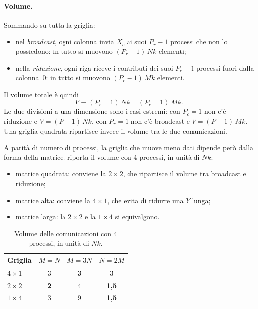 \documentclass[11pt,a4paper]{article}
\begin{document}
\paragraph{Volume.} Sommando su tutta la griglia:
\begin{itemize}
  \item nel \emph{broadcast}, ogni colonna invia $X_c$ ai suoi $P_r - 1$
        processi che non lo possiedono: in tutto si muovono
        $(P_r - 1)\, N k$ elementi;
  \item nella \emph{riduzione}, ogni riga riceve i contributi dei suoi
        $P_c - 1$ processi fuori dalla colonna~0: in tutto si muovono
        $(P_c - 1)\, M k$ elementi.
\end{itemize}
Il volume totale è quindi
\[
  V = (P_r - 1)\, N k + (P_c - 1)\, M k .
\]
Le due divisioni a una dimensione sono i casi estremi: con $P_c = 1$ non c'è
riduzione e $V = (P - 1)\, N k$, con $P_r = 1$ non c'è broadcast e
$V = (P - 1)\, M k$. Una griglia quadrata ripartisce invece il volume tra le
due comunicazioni.

A parità di numero di processi, la griglia che muove meno dati dipende però
dalla forma della matrice.  riporta il volume con 4 processi, in
unità di $N k$:
\begin{itemize}
  \item matrice quadrata: conviene la $2 \times 2$, che ripartisce il volume
        tra broadcast e riduzione;
  \item matrice alta: conviene la $4 \times 1$, che evita di ridurre una $Y$
        lunga;
  \item matrice larga: la $2 \times 2$ e la $1 \times 4$ si equivalgono.
\end{itemize}

\begin{table}[H]
  \centering
  \caption{Volume delle comunicazioni con 4 processi, in unità di $N k$.}\label{tab:volume}
  \begin{tabular}{lccc}
    \toprule
    Griglia & $M = N$ & $M = 3N$ & $N = 2M$ \\
    \midrule
    $4 \times 1$ & 3          & \textbf{3} & 3            \\
    $2 \times 2$ & \textbf{2} & 4          & \textbf{1,5} \\
    $1 \times 4$ & 3          & 9          & \textbf{1,5} \\
    \bottomrule
  \end{tabular}
\end{table}
\end{document}
